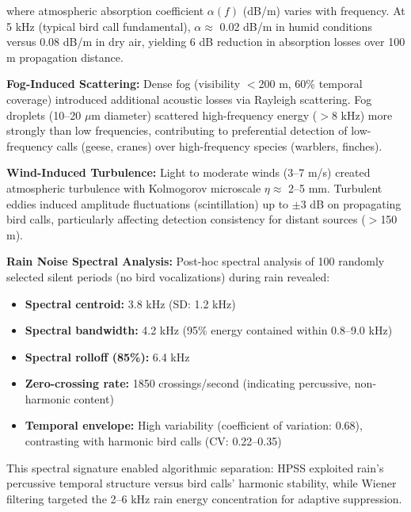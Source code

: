 \documentclass[twocolumn]{article}
\begin{document}
where atmospheric absorption coefficient $\alpha(f)$ (dB/m) varies with frequency. At 5 kHz (typical bird call fundamental), $\alpha \approx$ 0.02 dB/m in humid conditions versus 0.08 dB/m in dry air, yielding 6 dB reduction in absorption losses over 100 m propagation distance.

\textbf{Fog-Induced Scattering:} Dense fog (visibility $<$200 m, 60\% temporal coverage) introduced additional acoustic losses via Rayleigh scattering. Fog droplets (10--20 $\mu$m diameter) scattered high-frequency energy ($>$8 kHz) more strongly than low frequencies, contributing to preferential detection of low-frequency calls (geese, cranes) over high-frequency species (warblers, finches).

\textbf{Wind-Induced Turbulence:} Light to moderate winds (3--7 m/s) created atmospheric turbulence with Kolmogorov microscale $\eta \approx$ 2--5 mm. Turbulent eddies induced amplitude fluctuations (scintillation) up to $\pm$3 dB on propagating bird calls, particularly affecting detection consistency for distant sources ($>$150 m).

\textbf{Rain Noise Spectral Analysis:} Post-hoc spectral analysis of 100 randomly selected silent periods (no bird vocalizations) during rain revealed:

\begin{itemize}
\item \textbf{Spectral centroid:} 3.8 kHz (SD: 1.2 kHz)
\item \textbf{Spectral bandwidth:} 4.2 kHz (95\% energy contained within 0.8--9.0 kHz)
\item \textbf{Spectral rolloff (85\%):} 6.4 kHz
\item \textbf{Zero-crossing rate:} 1850 crossings/second (indicating percussive, non-harmonic content)
\item \textbf{Temporal envelope:} High variability (coefficient of variation: 0.68), contrasting with harmonic bird calls (CV: 0.22--0.35)
\end{itemize}

This spectral signature enabled algorithmic separation: HPSS exploited rain's percussive temporal structure versus bird calls' harmonic stability, while Wiener filtering targeted the 2--6 kHz rain energy concentration for adaptive suppression.
\end{document}
